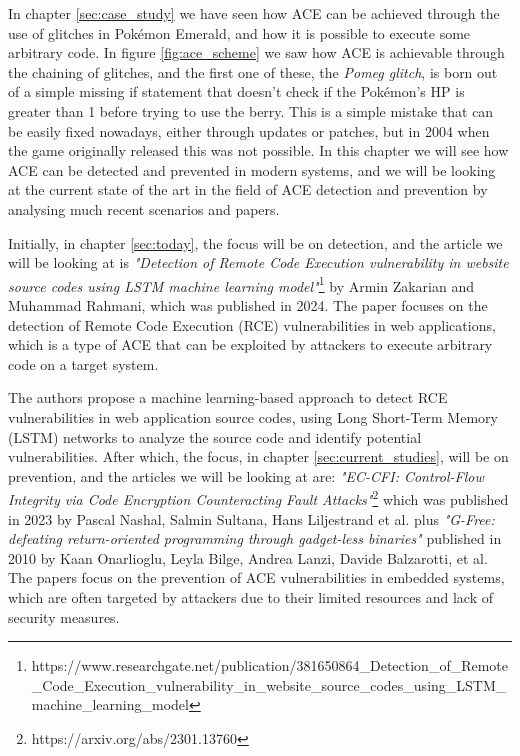 \documentclass[a4paper]{usiinfbachelorproject}
\begin{document}
In chapter \ref{sec:case_study} we have seen how ACE can be achieved through the use of glitches in Pokémon Emerald, and how it is possible to execute some arbitrary code. In figure \ref{fig:ace_scheme} we saw how ACE is achievable through the chaining of glitches, and the first one of these, the \textit{Pomeg glitch}, is born out of a simple missing if statement that doesn't check if the Pokémon's HP is greater than 1 before trying to use the berry. This is a simple mistake that can be easily fixed nowadays, either through updates or patches, but in 2004 when the game originally released this was not possible. In this chapter we will see how ACE can be detected and prevented in modern systems, and we will be looking at the current state of the art in the field of ACE detection and prevention by analysing much recent scenarios and papers.

Initially, in chapter \ref{sec:today}, the focus will be on detection, and the article we will be looking at is \textit{"Detection of Remote Code Execution vulnerability in website source codes using LSTM machine learning model"}\footnote{https://www.researchgate.net/publication/381650864\_Detection\_of\_Remote\_Code\_Execution\_vulnerability\_in\_website\_source\_codes\_using\_LSTM\_machine\_learning\_model} by Armin Zakarian and Muhammad Rahmani, which was published in 2024. The paper focuses on the detection of Remote Code Execution (RCE) vulnerabilities in web applications, which is a type of ACE that can be exploited by attackers to execute arbitrary code on a target system.

The authors propose a machine learning-based approach to detect RCE vulnerabilities in web application source codes, using Long Short-Term Memory (LSTM) networks to analyze the source code and identify potential vulnerabilities.
After which, the focus, in chapter \ref{sec:current_studies}, will be on prevention, and the articles we will be looking at are: \textit{"EC-CFI: Control-Flow Integrity via Code Encryption Counteracting Fault Attacks"}\footnote{https://arxiv.org/abs/2301.13760} which was published in 2023 by Pascal Nashal, Salmin Sultana, Hans Liljestrand et al. plus \textit{"G-Free: defeating return-oriented programming through gadget-less binaries"} published in 2010 by Kaan Onarlioglu, Leyla Bilge, Andrea Lanzi, Davide Balzarotti, et al. The papers focus on the prevention of ACE vulnerabilities in embedded systems, which are often targeted by attackers due to their limited resources and lack of security measures.
\end{document}
